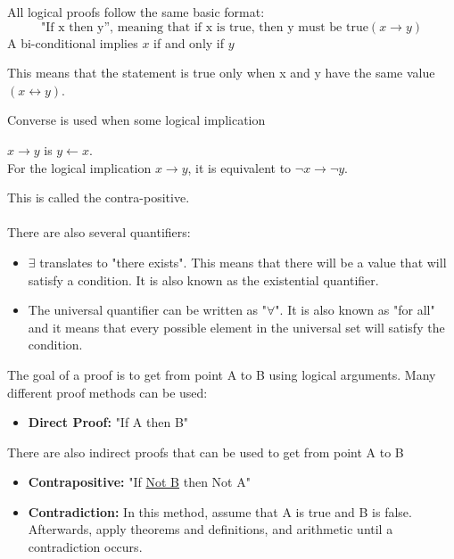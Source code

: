 \documentclass{article}
\begin{document}
All logical proofs follow the same basic format: 
$$\textrm{"If x then y”, meaning that if x is true, then y must be true}
(x \rightarrow y)$$
A bi-conditional implies $x$ if and only if $y$
\begin{center}
This means that the statement is true only when x and y have the same value
$(x \leftrightarrow y)$.
\end{center}
 Converse is used when some logical implication
 \begin{center}
    $ x \rightarrow y$ is $y \leftarrow x$. \\ For the logical implication $x \rightarrow y$, it is equivalent to $\neg x \rightarrow \neg y$.
 \end{center} This is called the contra-positive.
\\\\
There are also several quantifiers:
\begin{itemize}
    \item $\exists$ translates to "there exists". This means that there will be a value that will satisfy a condition. It is also known as the existential quantifier. 
    \item The universal quantifier can be written as "$\forall$". It is also known as "for all" and it means that every possible element in the universal set will satisfy the condition.
\end{itemize}

The goal of a proof is to get from point A to B using logical arguments. Many different proof methods can be used:
\begin{itemize}
    \item \textbf{Direct Proof:} "If A then B"
\end{itemize}
There are also indirect proofs that can be used to get from point A
to B
\begin{itemize}
    \item \textbf{Contrapositive:} "If \underline{Not B} then Not A"
    \item \textbf{Contradiction:} In this method, assume that A is true
    and B is false. Afterwards, apply theorems and definitions, and
    arithmetic until a contradiction occurs.
\end{itemize}
\end{document}
